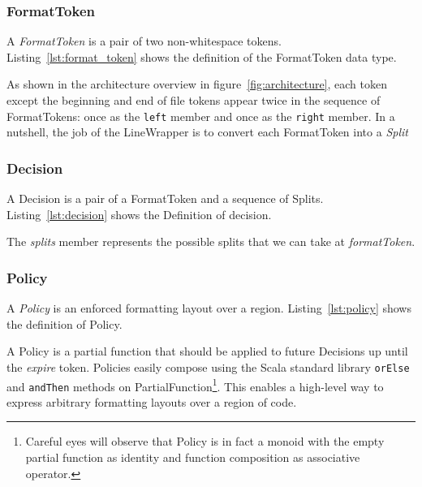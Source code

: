 \subsubsection{FormatToken}
A \emph{FormatToken} is a pair of two non-whitespace tokens.
Listing~\ref{lst:format_token} shows the definition of the FormatToken data type.

As shown in the architecture overview in figure~\ref{fig:architecture}, each token except the beginning and end of file tokens appear twice in the sequence of FormatTokens: once as the \texttt{left} member and once as the \texttt{right} member.
In a nutshell, the job of the LineWrapper is to convert each FormatToken into a \emph{Split}

\subsubsection{Decision}\label{sec:decision}
A Decision is a pair of a FormatToken and a sequence of Splits.
Listing~\ref{lst:decision} shows the Definition of decision.

The \emph{splits} member represents the possible splits that we can take at \emph{formatToken}.

\subsubsection{Policy}\label{sec:policy}
A \emph{Policy} is an enforced formatting layout over a region.
Listing~\ref{lst:policy} shows the definition of Policy.
\begin{minipage}{\linewidth}
  
\end{minipage}
A Policy is a partial function that should be applied to future Decisions up until the \emph{expire} token.
Policies easily compose using the Scala standard library \texttt{orElse} and \texttt{andThen} methods on PartialFunction\footnote{
  Careful eyes will observe that Policy is in fact a monoid with the empty partial function as identity and function composition as associative operator.}.
This enables a high-level way to express arbitrary formatting layouts over a region of code.

